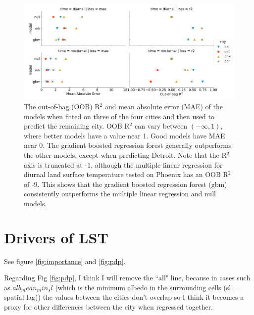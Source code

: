 \documentclass[]{elsarticle}
\begin{document}
\begin{figure}[h]
\begin{center}
\includegraphics[width=\textwidth]{fig/report/cities_holdout.pdf}
\caption{The out-of-bag (OOB) R$^2$ and mean absolute error (MAE) of the models when fitted on three of the four cities and then used to predict the remaining city. OOB R$^2$ can vary between $(-\infty, 1)$, where better models have a value near 1. Good models have MAE near 0. The gradient boosted regression forest generally outperforms the other models, except when predicting Detroit. Note that the R$^2$ axis is truncated at -1, although the multiple linear regression for diurnal land surface temperature tested on Phoenix has an OOB R$^2$ of -9.  This shows that the gradient boosted regression forest (gbm) consistently outperforms the multiple linear regression and null models.}
\label{fig:intercity}
\end{center}
\end{figure}


\section{Drivers of LST}
See figure \ref{fig:importance} and \ref{fig:pdp}.

Regarding Fig \ref{fig:pdp}, I think I will remove the ``all" line, because in cases such as $alb_mean_min_sl$ (which is the minimum albedo in the surrounding cells (sl = spatial lag)) the values between the cities don't overlap so I think it becomes a proxy for other differences between the city when regressed together.
\end{document}
